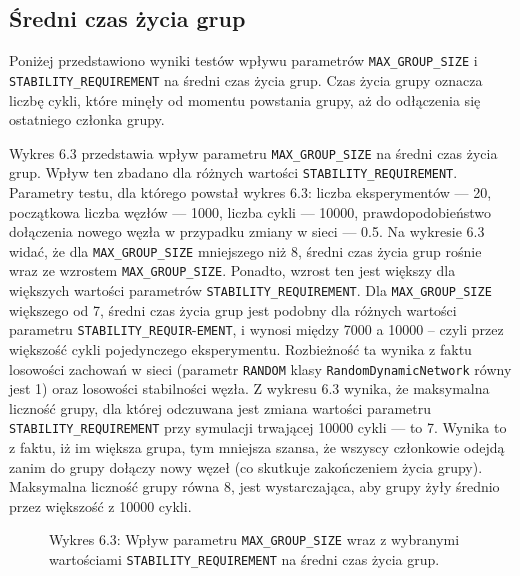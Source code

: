 \documentclass[12pt, twoside, openany]{report}
\begin{document}
\subsection{Średni czas życia grup}

Poniżej przedstawiono wyniki testów wpływu parametrów \texttt{MAX\_GROUP\_SIZE} i \texttt{STABILITY\_REQUIREMENT} na średni czas życia grup. Czas życia grupy oznacza liczbę cykli, które minęły od momentu powstania grupy, aż do odłączenia się ostatniego członka grupy.

Wykres 6.3 przedstawia wpływ parametru \texttt{MAX\_GROUP\_SIZE} na średni czas życia grup. Wpływ ten zbadano dla różnych wartości \texttt{STABILITY\_REQUIREMENT}. Parametry testu, dla którego powstał wykres 6.3: liczba eksperymentów --- 20, początkowa liczba węzłów --- 1000, liczba cykli --- 10000, prawdopodobieństwo dołączenia nowego węzła w przypadku zmiany w sieci --- 0.5. Na wykresie 6.3 widać, że dla \texttt{MAX\_GROUP\_SIZE} mniejszego niż 8, średni czas życia grup rośnie wraz ze wzrostem \texttt{MAX\_GROUP\_SIZE}. Ponadto, wzrost ten jest większy dla większych wartości parametrów \texttt{STABILITY\_REQUIREMENT}. Dla \texttt{MAX\_GROUP\_SIZE} większego od 7, średni czas życia grup jest podobny dla różnych wartości parametru \texttt{STABILITY\_REQUIR}-\texttt{EMENT}, i wynosi między 7000 a 10000 -- czyli przez większość cykli pojedynczego eksperymentu. Rozbieżność ta wynika z faktu losowości zachowań w sieci (parametr \texttt{RANDOM} klasy \texttt{RandomDynamicNetwork} równy jest 1) oraz losowości stabilności węzła. Z wykresu 6.3 wynika, że maksymalna liczność grupy, dla której odczuwana jest zmiana wartości parametru  \texttt{STABILITY\_REQUIREMENT} przy symulacji trwającej 10000 cykli --- to 7. Wynika to z faktu, iż im większa grupa, tym mniejsza szansa, że wszyscy członkowie odejdą zanim do grupy dołączy nowy węzeł (co skutkuje zakończeniem życia grupy). Maksymalna liczność grupy równa 8, jest wystarczająca, aby grupy żyły średnio przez większość z 10000 cykli.

\begin{figure}[H]
\captionsetup{labelformat=empty}
\caption{Wykres 6.3: Wpływ parametru \texttt{MAX\_GROUP\_SIZE} wraz z wybranymi wartościami \texttt{STABILITY\_REQUIREMENT} na średni czas życia grup.}
\end{figure}
\end{document}

